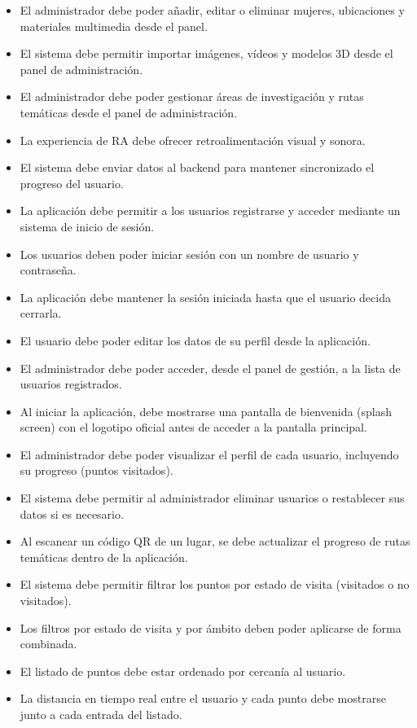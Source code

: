 \begin{itemize}
\item[RF17:] El administrador debe poder añadir, editar o eliminar mujeres, ubicaciones y materiales multimedia desde el panel.
\item[RF18:] El sistema debe permitir importar imágenes, vídeos y modelos 3D desde el panel de administración.
\item[RF19:] El administrador debe poder gestionar áreas de investigación y rutas temáticas desde el panel de administración. 
\item[RF20:] La experiencia de RA debe ofrecer retroalimentación visual y sonora.
\item[RF21:] El sistema debe enviar datos al backend para mantener sincronizado el progreso del usuario.
\item[RF22:] La aplicación debe permitir a los usuarios registrarse y acceder mediante un sistema de inicio de sesión.
\item[RF23:] Los usuarios deben poder iniciar sesión con un nombre de usuario y contraseña.
\item[RF24:] La aplicación debe mantener la sesión iniciada hasta que el usuario decida cerrarla.
\item[RF25:] El usuario debe poder editar los datos de su perfil desde la aplicación.
\item[RF26:] El administrador debe poder acceder, desde el panel de gestión, a la lista de usuarios registrados.
\item[RF27:] Al iniciar la aplicación, debe mostrarse una pantalla de bienvenida (splash screen) con el logotipo oficial antes de acceder a la pantalla principal.
\item[RF28:] El administrador debe poder visualizar el perfil de cada usuario, incluyendo su progreso (puntos visitados).
\item[RF29:] El sistema debe permitir al administrador eliminar usuarios o restablecer sus datos si es necesario.
\item[RF30:] Al escanear un código QR de un lugar, se debe actualizar el progreso de rutas temáticas dentro de la aplicación.
\item[RF31:] El sistema debe permitir filtrar los puntos por estado de visita (visitados o no visitados).
\item[RF32:] Los filtros por estado de visita y por ámbito deben poder aplicarse de forma combinada.
\item[RF33:] El listado de puntos debe estar ordenado por cercanía al usuario.
\item[RF34:] La distancia en tiempo real entre el usuario y cada punto debe mostrarse junto a cada entrada del listado.

\end{itemize}
